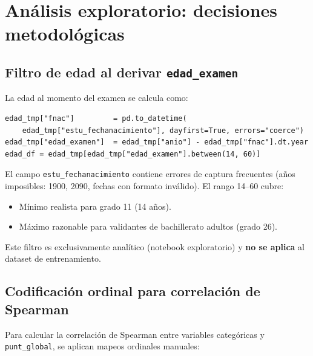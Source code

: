 \documentclass[12pt, a4paper]{article}
\begin{document}
\section{Análisis exploratorio: decisiones metodológicas}

\subsection{Filtro de edad al derivar \texttt{edad\_examen}}

La edad al momento del examen se calcula como:

\begin{lstlisting}
edad_tmp["fnac"]         = pd.to_datetime(
    edad_tmp["estu_fechanacimiento"], dayfirst=True, errors="coerce")
edad_tmp["edad_examen"]  = edad_tmp["anio"] - edad_tmp["fnac"].dt.year
edad_df = edad_tmp[edad_tmp["edad_examen"].between(14, 60)]
\end{lstlisting}

El campo \texttt{estu\_fechanacimiento} contiene errores de captura frecuentes
(años imposibles: 1900, 2090, fechas con formato inválido). El rango 14--60 cubre:

\begin{itemize}
  \item Mínimo realista para grado 11 (14 años).
  \item Máximo razonable para validantes de bachillerato adultos (grado 26).
\end{itemize}

\begin{nota}
  Este filtro es exclusivamente analítico (notebook exploratorio) y
  \textbf{no se aplica} al dataset de entrenamiento.
\end{nota}

\subsection{Codificación ordinal para correlación de Spearman}

Para calcular la correlación de Spearman entre variables categóricas y
\texttt{punt\_global}, se aplican mapeos ordinales manuales:
\end{document}
